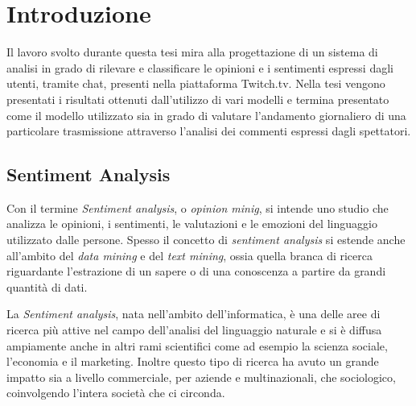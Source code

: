 \documentclass[a4paper,12pt,openright,twoside]{report}
\makeatletter
\theoremstyle{definition}
\def\cleardoublepage{\clearpage\if@twoside \ifodd\c@page\else
\hbox{}
\vspace*{\fill}
\begin{center}
\textit{}
\end{center}
\vspace{\fill}
\thispagestyle{empty}
\newpage
\if@twocolumn\hbox{}\newpage\fi\fi\fi}
\makeatother
\begin{document}


\begin{titlepage} 
\clearpage{\pagestyle{empty}\cleardoublepage}
\end{titlepage}
\chapter*{Introduzione}                 %
{}

Il lavoro svolto durante questa tesi mira alla progettazione di un sistema di analisi 
in grado di rilevare e classificare le opinioni e i sentimenti espressi dagli utenti,
tramite chat,
presenti nella piattaforma Twitch.tv.
Nella tesi vengono presentati i risultati ottenuti dall'utilizzo di vari modelli
e termina presentato come il modello utilizzato sia in grado di valutare l'andamento giornaliero
di una particolare trasmissione attraverso l'analisi dei commenti espressi dagli spettatori.

\section*{Sentiment Analysis}
\label{sec:sentAnal}
Con il termine \emph{Sentiment analysis}, o \emph{opinion minig}, si intende uno studio 
che analizza le opinioni, i sentimenti, le valutazioni e le
emozioni del linguaggio utilizzato dalle persone.
Spesso il concetto di \emph{sentiment analysis} si estende anche all'ambito del \emph{data mining} e
del \emph{text mining}, ossia quella branca di ricerca riguardante l'estrazione di un sapere o 
di una conoscenza a partire da grandi quantità di dati.

La \emph{Sentiment analysis}, nata nell'ambito dell'informatica, è una delle aree di ricerca più attive 
nel campo dell'analisi del linguaggio naturale e si è diffusa
ampiamente anche in altri rami scientifici come ad esempio la scienza sociale,
l'economia e il marketing. Inoltre questo tipo di ricerca
ha avuto un grande impatto sia a livello commerciale, per aziende e multinazionali, che sociologico, 
coinvolgendo l'intera società che ci circonda.
\end{document}
